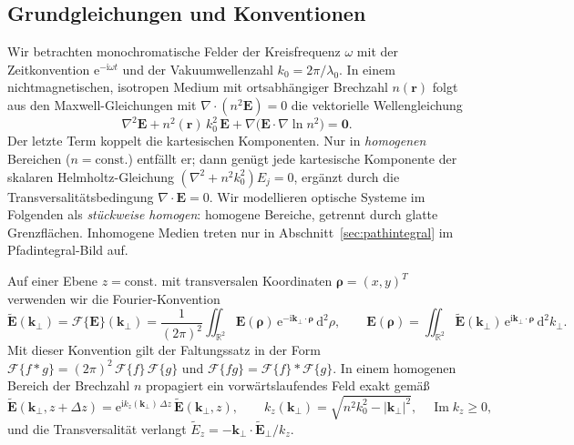 \documentclass[11pt,a4paper]{scrartcl}
\theoremstyle{insightstyle}
\newcommand{\dd}{\mathrm{d}}
\newcommand{\ii}{\mathrm{i}}
\newcommand{\ee}{\mathrm{e}}
\newcommand{\R}{\mathbb{R}}
\newcommand{\F}{\mathcal{F}}
\newcommand{\rh}{\bm{\rho}}
\newcommand{\kp}{\bm{k}_\perp}
\begin{document}
\subsection{Grundgleichungen und Konventionen}
Wir betrachten monochromatische Felder der Kreisfrequenz $\omega$ mit der Zeitkonvention $\ee^{-\ii\omega t}$ und der Vakuumwellenzahl $k_0=2\pi/\lambda_0$. In einem nichtmagnetischen, isotropen Medium mit ortsabhängiger Brechzahl $n(\bm r)$ folgt aus den Maxwell-Gleichungen mit $\nabla\cdot(n^2\bm E)=0$ die vektorielle Wellengleichung
\begin{equation}
    \nabla^2\bm E + n^2(\bm r)\,k_0^2\,\bm E + \nabla\!\big(\bm E\cdot\nabla\ln n^2\big) = \bm 0 .
    \label{eq:vector_wave}
\end{equation}
Der letzte Term koppelt die kartesischen Komponenten. Nur in \emph{homogenen} Bereichen ($n=\text{const.}$) entfällt er; dann genügt jede kartesische Komponente der skalaren Helmholtz-Gleichung $(\nabla^2+n^2k_0^2)E_j=0$, ergänzt durch die Transversalitätsbedingung $\nabla\cdot\bm E=0$. Wir modellieren optische Systeme im Folgenden als \emph{stückweise homogen}: homogene Bereiche, getrennt durch glatte Grenzflächen. Inhomogene Medien treten nur in Abschnitt~\ref{sec:pathintegral} im Pfadintegral-Bild auf.

Auf einer Ebene $z=\text{const.}$ mit transversalen Koordinaten $\rh=(x,y)^T$ verwenden wir die Fourier-Konvention
\begin{equation}
    \tilde{\bm E}(\kp) = \F\{\bm E\}(\kp) = \frac{1}{(2\pi)^2}\iint_{\R^2}\bm E(\rh)\,\ee^{-\ii\kp\cdot\rh}\,\dd^2\rho,
    \qquad
    \bm E(\rh) = \iint_{\R^2}\tilde{\bm E}(\kp)\,\ee^{\ii\kp\cdot\rh}\,\dd^2k_\perp .
    \label{eq:ft_convention}
\end{equation}
Mit dieser Konvention gilt der Faltungssatz in der Form $\F\{f*g\}=(2\pi)^2\,\F\{f\}\,\F\{g\}$ und $\F\{fg\}=\F\{f\}*\F\{g\}$. In einem homogenen Bereich der Brechzahl $n$ propagiert ein vorwärtslaufendes Feld exakt gemäß
\begin{equation}
    \tilde{\bm E}(\kp,z+\Delta z) = \ee^{\ii k_z(\kp)\,\Delta z}\,\tilde{\bm E}(\kp,z),
    \qquad k_z(\kp)=\sqrt{n^2k_0^2-|\kp|^2},\quad \operatorname{Im}k_z\ge 0,
    \label{eq:spw}
\end{equation}
und die Transversalität verlangt $\tilde E_z = -\kp\cdot\tilde{\bm E}_\perp/k_z$.
\end{document}
